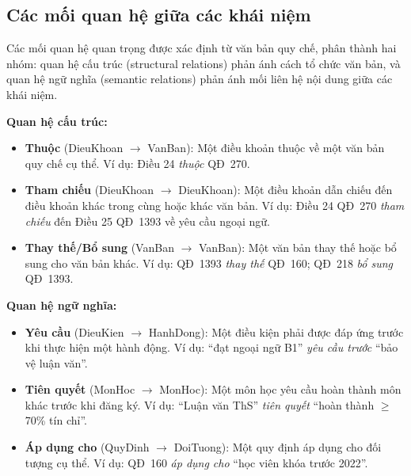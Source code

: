 \subsection{Các mối quan hệ giữa các khái niệm}
\label{subsec:quanhe}

Các mối quan hệ quan trọng được xác định từ văn bản quy chế, phân thành hai nhóm:
quan hệ cấu trúc (structural relations) phản ánh cách tổ chức văn bản, và quan hệ
ngữ nghĩa (semantic relations) phản ánh mối liên hệ nội dung giữa các khái niệm.

\textbf{Quan hệ cấu trúc:}

\begin{itemize}
    \item \textbf{Thuộc} (DieuKhoan $\rightarrow$ VanBan): Một điều khoản thuộc về
          một văn bản quy chế cụ thể. Ví dụ: Điều 24 \textit{thuộc} QĐ~270.

    \item \textbf{Tham chiếu} (DieuKhoan $\rightarrow$ DieuKhoan): Một điều khoản
          dẫn chiếu đến điều khoản khác trong cùng hoặc khác văn bản. Ví dụ: Điều 24
          QĐ~270 \textit{tham chiếu} đến Điều 25 QĐ~1393 về yêu cầu ngoại ngữ.

    \item \textbf{Thay thế/Bổ sung} (VanBan $\rightarrow$ VanBan): Một văn bản thay
          thế hoặc bổ sung cho văn bản khác. Ví dụ: QĐ~1393 \textit{thay thế}
          QĐ~160; QĐ~218 \textit{bổ sung} QĐ~1393.
\end{itemize}

\textbf{Quan hệ ngữ nghĩa:}

\begin{itemize}
    \item \textbf{Yêu cầu} (DieuKien $\rightarrow$ HanhDong): Một điều kiện phải
          được đáp ứng trước khi thực hiện một hành động. Ví dụ: ``đạt ngoại ngữ
          B1'' \textit{yêu cầu trước} ``bảo vệ luận văn''.

    \item \textbf{Tiên quyết} (MonHoc $\rightarrow$ MonHoc): Một môn học yêu cầu
          hoàn thành môn khác trước khi đăng ký. Ví dụ: ``Luận văn ThS''
          \textit{tiên quyết} ``hoàn thành $\geq$ 70\% tín chỉ''.

    \item \textbf{Áp dụng cho} (QuyDinh $\rightarrow$ DoiTuong): Một quy định áp
          dụng cho đối tượng cụ thể. Ví dụ: QĐ~160 \textit{áp dụng cho} ``học viên
          khóa trước 2022''.
\end{itemize}

